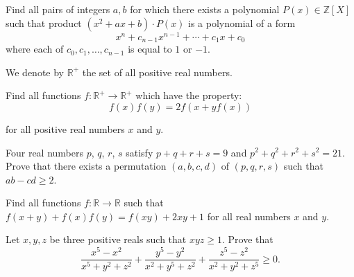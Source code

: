 \item[\textbf{A1.}]
Find all pairs of integers 
$a,b$
 for which there exists a polynomial 
$P(x) \in \mathbb{Z}[X]$
 such that product 
$(x^2+ax+b)\cdot P(x)$
 is a polynomial of a form 
\[ x^n+c_{n-1}x^{n-1}+\cdots+c_1x+c_0  \]
 where each of 
$c_0,c_1,\ldots,c_{n-1}$
 is equal to 
$1$
 or 
$-1$.

\item[\textbf{A2.}]
We denote by 
$\mathbb{R}^+$
 the set of all positive real numbers.


Find all functions 
$f: \mathbb R^ + \rightarrow\mathbb R^ +$
 which have the property:
\[f(x)f(y)=2f(x+yf(x))\]


for all positive real numbers 
$x$
 and 
$y$.

\item[\textbf{A3.}]
Four real numbers 
$ p$, 
$ q$, 
$ r$, 
$ s$
 satisfy 
$ p+q+r+s = 9$
 and 
$ p^{2}+q^{2}+r^{2}+s^{2}= 21$.
 Prove that there exists a permutation 
$ \left(a,b,c,d\right)$
 of 
$ \left(p,q,r,s\right)$
 such that 
$ ab-cd \geq 2$.

\item[\textbf{A4.}]
Find all functions 
$ f: \mathbb{R}\to\mathbb{R}$
 such that 
$ f(x+y)+f(x)f(y)=f(xy)+2xy+1$
 for all real numbers 
$ x$
 and 
$ y$.

\item[\textbf{A5.}]
Let 
$x,y,z$
 be three positive reals such that 
$xyz\geq 1$.
 Prove that
\[ \frac { x^5-x^2 }{x^5+y^2+z^2} + \frac {y^5-y^2}{x^2+y^5+z^2} + \frac {z^5-z^2}{x^2+y^2+z^5} \geq 0 . \]
